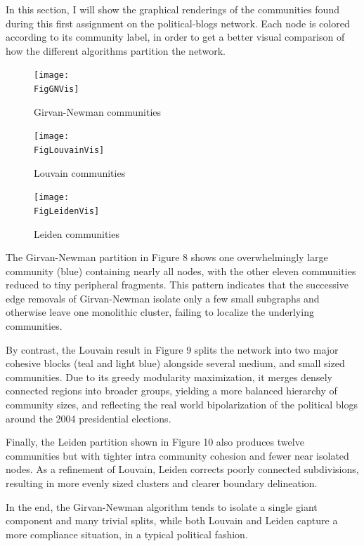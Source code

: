 \documentclass{article}
\begin{document}
In this section, I will show the graphical renderings of the communities found during this first assignment on the political-blogs network. 
Each node is colored according to its community label, in order to get a better visual comparison of how the different algorithms partition the network. 

\begin{figure}[H]
  \centering
  \texttt{[image: \\FigGNVis]}
  \caption{Girvan-Newman communities}
  \label{fig:gn-visualization}
\end{figure}

\begin{figure}[H]
  \centering
  \texttt{[image: \\FigLouvainVis]}
  \caption{Louvain communities}
  \label{fig:louvain-visualization}
\end{figure}

\begin{figure}[H]
  \centering
  \texttt{[image: \\FigLeidenVis]}
  \caption{Leiden communities}
  \label{fig:leiden-visualization}
\end{figure}


The Girvan-Newman partition in Figure 8 shows one overwhelmingly large community (blue) containing nearly all nodes, with the other eleven communities reduced to tiny peripheral fragments. 
This pattern indicates that the successive edge removals of Girvan-Newman isolate only a few small subgraphs and otherwise leave one monolithic cluster, failing to localize the underlying communities.

By contrast, the Louvain result in Figure 9 splits the network into two major cohesive blocks (teal and light blue) alongside several medium, and small sized communities. 
Due to its greedy modularity maximization, it merges densely connected regions into broader groups, yielding a more balanced hierarchy of community sizes, and reflecting the real world bipolarization of the political blogs around the 2004 presidential elections.

Finally, the Leiden partition shown in Figure 10 also produces twelve communities but with tighter intra community cohesion and fewer near isolated nodes. 
As a refinement of Louvain, Leiden corrects poorly connected subdivisions, resulting in more evenly sized clusters and clearer boundary delineation.

In the end, the Girvan-Newman algorithm tends to isolate a single giant component and many trivial splits, while both Louvain and Leiden capture a more compliance situation, in a typical political fashion.
\end{document}
